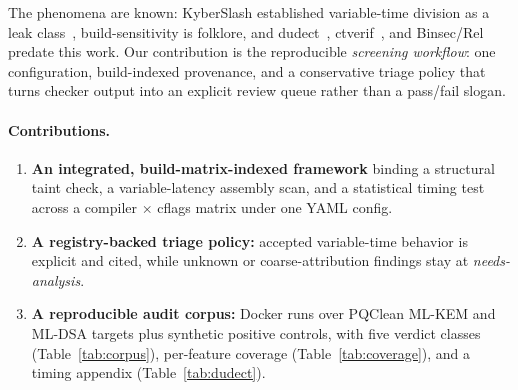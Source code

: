 The phenomena are known: KyberSlash established variable-time division as a leak
class~\cite{kyberslash}, build-sensitivity is folklore, and dudect~\cite{dudect},
ctverif~\cite{ctverif}, and Binsec/Rel~\cite{binsecrel} predate this work. Our
contribution is the reproducible \emph{screening workflow}: one configuration,
build-indexed provenance, and a conservative triage policy that turns checker
output into an explicit review queue rather than a pass/fail slogan.

\paragraph{Contributions.}
\begin{enumerate}
  \item \textbf{An integrated, build-matrix-indexed framework} binding a structural
    taint check, a variable-latency assembly scan, and a statistical timing test
    across a compiler $\times$ cflags matrix under one YAML config.
  \item \textbf{A registry-backed triage policy:} accepted variable-time behavior
    is explicit and cited, while unknown or coarse-attribution findings stay at
    \emph{needs-analysis}.
  \item \textbf{A reproducible audit corpus:} Docker runs over PQClean ML-KEM and
    ML-DSA targets plus synthetic positive controls, with five verdict classes
    (Table~\ref{tab:corpus}), per-feature coverage (Table~\ref{tab:coverage}), and
    a timing appendix (Table~\ref{tab:dudect}).
\end{enumerate}
